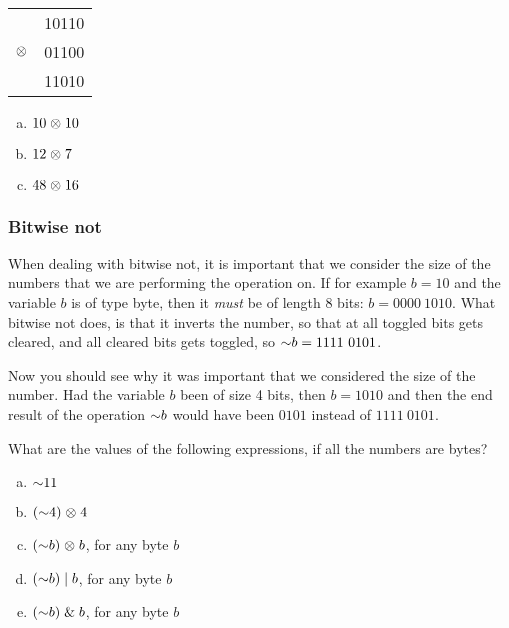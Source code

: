 \begin{center}
  \begin{tabular}{lr}
              & 10110  \\
    $\mathrel{\otimes}$ & 01100 \\
    \hline
              & 11010 \\
  \end{tabular}
\end{center}

\begin{Exercise}[label={bitxor}]
  \begin{enumerate}[(a)]
  \item $10 \mathrel{\otimes} 10$
  \item $12 \mathrel{\otimes} 7$
  \item $48 \mathrel{\otimes} 16$
  \end{enumerate}
\end{Exercise}

\subsubsection{Bitwise not}

When dealing with bitwise not, it is important that we consider the
size of the numbers that we are performing the operation on. If for
example $b=10$ and the variable $b$ is of type byte, then it
\textit{must} be of length 8 bits: $b=0000\ 1010$. What bitwise not
does, is that it inverts the number, so that at all toggled bits gets
cleared, and all cleared bits gets toggled, so $\mathord{\sim} b = 1111\
0101$.

Now you should see why it was important that we considered the size of
the number. Had the variable $b$ been of size 4 bits, then $b = 1010$
and then the end result of the operation $\mathord{\sim} b$ would have been
$0101$ instead of $1111\ 0101$.

\begin{Exercise}[label={bitnot}]
  What are the values of the following expressions, if all the numbers
  are bytes?

  \begin{enumerate}[(a)]
  \item $\mathord{\sim} 11$
  \item $(\mathord{\sim} 4) \mathrel{\otimes} 4$
  \item $(\mathord{\sim} b) \mathrel{\otimes} b$, for any byte $b$
  \item $(\mathord{\sim} b) \mathrel{|} b$, for any byte $b$
  \item $(\mathord{\sim} b) \mathrel{\&} b$, for any byte $b$
  \end{enumerate}

\end{Exercise}

